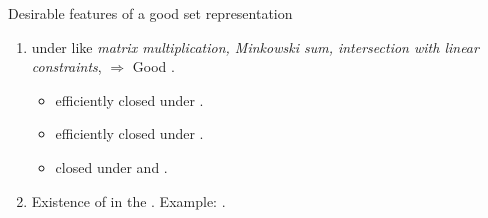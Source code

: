 \begin{frame}{Desirable features of a good set representation}
%
\begin{enumerate}
\item {} under  like {\it matrix
multiplication, Minkowski sum, intersection with linear constraints}, $\Rightarrow$
 Good .
%
\begin{itemize}
\item {} efficiently closed under .
\item {} efficiently closed under .
\item {} closed under  and .
\end{itemize}
\pause
%
\item Existence of  in the
.  Example: .
\end{enumerate}
%
\end{frame}


